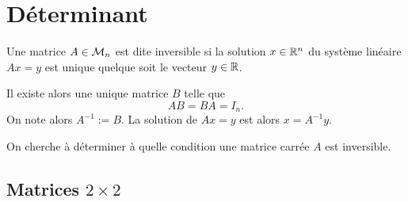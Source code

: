 \section{Déterminant} \label{sec:LinAlg-Det}

\begin{definition} \label{def:matriceInversible}
  Une matrice $A \in \mathcal{M}_n$ est dite inversible si la solution $x \in \mathbb{R}^n$ du système linéaire $A x = y$ est unique quelque soit le vecteur $y \in \mathbb{R}$.
\end{definition}

Il existe alors une unique matrice $B$ telle que 
$$
AB = BA = I_n.
$$
On note alors $A^{-1} := B$. La solution de $Ax = y$ est alors $x = A^{-1} y$.

\bigskip
On cherche à déterminer à quelle condition une matrice carrée $A$ est inversible.

\subsection{Matrices $2 \times 2$} 

